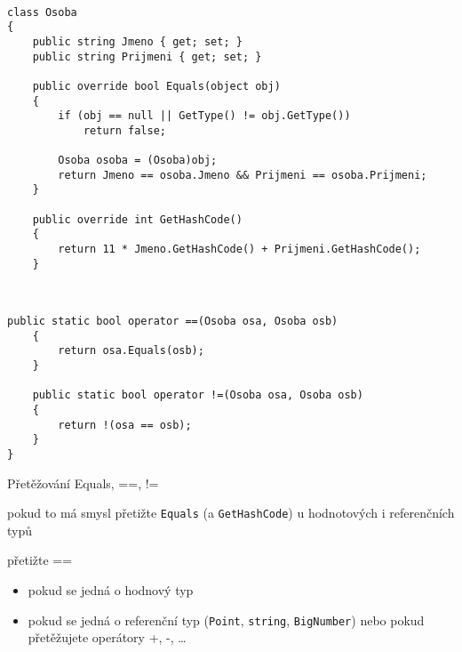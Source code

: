 \begin{frame}[fragile]
\begin{bonusblock}{~}
\begin{lstlisting}[basicstyle=\small]
class Osoba
{
	public string Jmeno { get; set; }
	public string Prijmeni { get; set; }
	
	public override bool Equals(object obj)
	{
	    if (obj == null || GetType() != obj.GetType())
	        return false;
	
	    Osoba osoba = (Osoba)obj;
	    return Jmeno == osoba.Jmeno && Prijmeni == osoba.Prijmeni;
	}
	
	public override int GetHashCode()
	{
		return 11 * Jmeno.GetHashCode() + Prijmeni.GetHashCode();
	}
\end{lstlisting}
\end{bonusblock}
\end{frame}


\begin{frame}[fragile]
\begin{bonusblock}{~}
\begin{lstlisting}[basicstyle=\small]
	public static bool operator ==(Osoba osa, Osoba osb)
	{
	    return osa.Equals(osb);
	}
	
	public static bool operator !=(Osoba osa, Osoba osb)
	{
	    return !(osa == osb);
	}
}
\end{lstlisting}
\end{bonusblock}

\begin{bitemize}{Přetěžování Equals, ==, !=}
\item pokud to má smysl přetižte \lstinline|Equals| (a \lstinline|GetHashCode|) u hodnotových i referenčních typů
\item přetižte ==
\begin{itemize}
\item pokud se jedná o hodnový typ
\item pokud se jedná o referenční  typ (\lstinline|Point|, \lstinline|string|, \lstinline|BigNumber|) nebo pokud přetěžujete operátory +, -, \ldots
\end{itemize}
\end{bitemize}
\end{frame}







